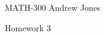 \documentclass{article}
\begin{document}
  MATH-300 \hfill Andrew Jones
  \begin{center}
  Homework 3
  \end{center}
\end{document}
